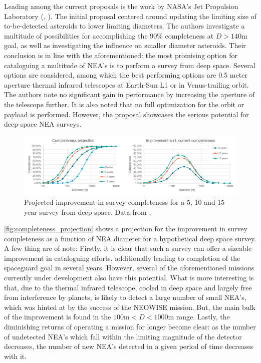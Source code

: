 Leading among the current proposals is the work by NASA's Jet Propulsion Laboratory (\cite{2003NEOSDT}, \cite{2017NEOSDT}). The initial proposal centered around updating the limiting size of to-be-detected asteroids to lower limiting diameters. The authors investigate a multitude of possibilities for accomplishing the 90\% completeness at $D > 140 \mathrm{m}$ goal, as well as investigating the influence on smaller diameter asteroids. Their conclusion is in line with the aforementioned: the most promising option for cataloguing a multitude of NEA's is to perform a survey from deep space. Several options are considered, among which the best performing options are 0.5 meter aperture thermal infrared telescopes at Earth-Sun L1 or in Venus-trailing orbit. The authors note no significant gain in performance by increasing the aperture of the telescope further. It is also noted that no full optimization for the orbit or payload is performed. However, the proposal showcases the serious potential for deep-space NEA surveys. \\

\begin{figure}[htbp]
 \centering
 \includegraphics[width=1.0\textwidth]{img/completeness_projection.pdf}
 \caption{Projected improvement in survey completeness for a 5, 10 and 15 year survey from deep space. Data from \cite{2017NEOSDT}.}
 \label{fig:completeness_projection}
\end{figure}

\autoref{fig:completeness_projection} shows a projection for the improvement in survey completeness as a function of NEA diameter for a hypothetical deep space survey. A few thing are of note: Firstly, it is clear that such a survey can offer a sizeable improvement in cataloguing efforts, additionally leading to completion of the spaceguard goal in several years. However, several of the aforementioned missions currently under development also have this potential. What is more interesting is that, due to the thermal infrared telescope, cooled in deep space and largely free from interference by planets, is likely to detect a large number of small NEA's, which was hinted at by the success of the NEOWISE mission. But, the main bulk of the improvement is found in the $100 \mathrm{m} < D < 1000 \mathrm{m}$ range. Lastly, the diminishing returns of operating a mission for longer become clear: as the number of undetected NEA's which fall within the limiting magnitude of the detector decreases, the number of new NEA's detected in a given period of time decreases with it. \\

